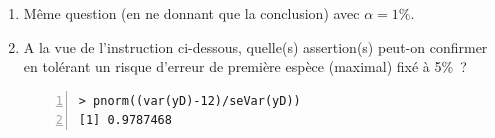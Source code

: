 \documentclass[10pt]{report}
\begin{document}
\begin{exercice}[Dictée]
\begin{enumerate}
\item Même question (en ne donnant que la conclusion) avec $\alpha=1\%$.  


\item A la vue de l'instruction ci-dessous, quelle(s) assertion(s) peut-on confirmer en tolérant un risque d'erreur de première espèce (maximal) fixé à 5\%~?

\begin{Verbatim}[frame=leftline,fontfamily=tt,fontshape=n,numbers=left]
> pnorm((var(yD)-12)/seVar(yD))
[1] 0.9787468
\end{Verbatim}



\end{enumerate}

\end{exercice}
\end{document}
